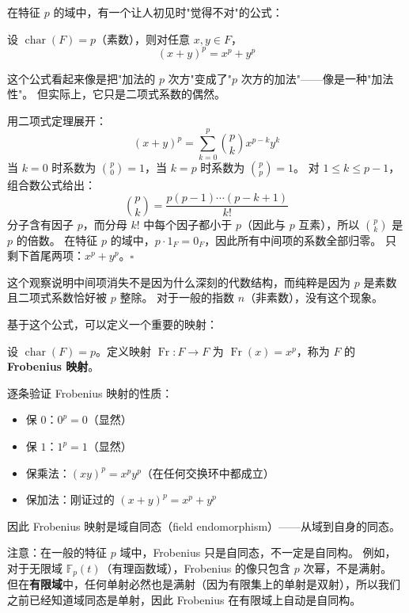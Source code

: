 在特征 $p$ 的域中，有一个让人初见时"觉得不对"的公式：

\begin{proposition}[特征 $p$ 域中的二项式定理]\label{prop:frobenius-binomial}
设 $\operatorname{char}(F) = p$（素数），则对任意 $x, y \in F$，
\[
(x + y)^p = x^p + y^p
\]
\end{proposition}

这个公式看起来像是把"加法的 $p$ 次方"变成了"$p$ 次方的加法"——像是一种"加法性"。
但实际上，它只是二项式系数的偶然。

用二项式定理展开：
\[
(x + y)^p = \sum_{k=0}^{p} \binom{p}{k} x^{p-k} y^k
\]
当 $k = 0$ 时系数为 $\binom{p}{0} = 1$，当 $k = p$ 时系数为 $\binom{p}{p} = 1$。
对 $1 \leq k \leq p-1$，组合数公式给出：
\[
\binom{p}{k} = \frac{p(p-1)\cdots(p-k+1)}{k!}
\]
分子含有因子 $p$，而分母 $k!$ 中每个因子都小于 $p$（因此与 $p$ 互素），所以 $\binom{p}{k}$ 是 $p$ 的倍数。
在特征 $p$ 的域中，$p \cdot 1_F = 0_F$，因此所有中间项的系数全部归零。
只剩下首尾两项：$x^p + y^p$。$\square$

这个观察说明中间项消失不是因为什么深刻的代数结构，而纯粹是因为 $p$ 是素数且二项式系数恰好被 $p$ 整除。
对于一般的指数 $n$（非素数），没有这个现象。

基于这个公式，可以定义一个重要的映射：

\begin{definition}[Frobenius 映射]\label{def:frobenius}
设 $\operatorname{char}(F) = p$。定义映射 $\operatorname{Fr}: F \to F$ 为 $\operatorname{Fr}(x) = x^p$，称为 $F$ 的\textbf{Frobenius 映射}。
\end{definition}

逐条验证 Frobenius 映射的性质：
\begin{itemize}
    \item 保 $0$：$0^p = 0$（显然）
    \item 保 $1$：$1^p = 1$（显然）
    \item 保乘法：$(xy)^p = x^p y^p$（在任何交换环中都成立）
    \item 保加法：刚证过的 $(x+y)^p = x^p + y^p$
\end{itemize}
因此 Frobenius 映射是域自同态（field endomorphism）——从域到自身的同态。

注意：在一般的特征 $p$ 域中，Frobenius 只是自同态，不一定是自同构。
例如，对于无限域 $\mathbb{F}_p(t)$（有理函数域），Frobenius 的像只包含 $p$ 次幂，不是满射。
但在\textbf{有限域}中，任何单射必然也是满射（因为有限集上的单射是双射），所以我们之前已经知道域同态是单射，因此 Frobenius 在有限域上自动是自同构。

